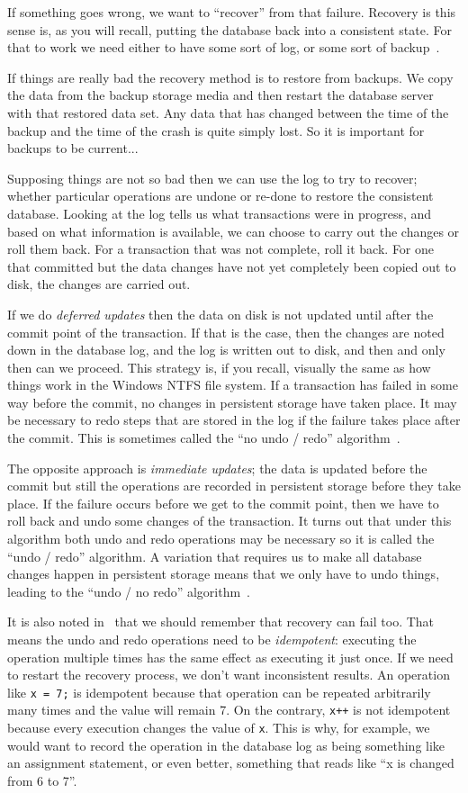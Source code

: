 If something goes wrong, we want to ``recover'' from that failure. Recovery is this sense is, as you will recall, putting the database back into a consistent state. For that to work we need either to have some sort of log, or some sort of backup~\cite{fds}.

If things are really bad the recovery method is to restore from backups. We copy the data from the backup storage media and then restart the database server with that restored data set. Any data that has changed between the time of the backup and the time of the crash is quite simply lost. So it is important for backups to be current...

Supposing things are not so bad then we can use the log to try to recover; whether particular operations are undone or re-done to restore the consistent database. Looking at the log tells us what transactions were in progress, and based on what information is available, we can choose to carry out the changes or roll them back. For a transaction that was not complete, roll it back. For one that committed but the data changes have not yet completely been copied out to disk,  the changes are carried out.

If we do \textit{deferred updates} then the data on disk is not updated until after the commit point of the transaction. If that is the case, then the changes are noted down in the database log, and the log is written out to disk, and then and only then can we proceed. This strategy is, if you recall, visually the same as how things work in the Windows NTFS file system. If a transaction has failed in some way before the commit, no changes in persistent storage have taken place. It may be necessary to redo steps that are stored in the log if the failure takes place after the commit. This is sometimes called the ``no undo / redo'' algorithm~\cite{fds}.

The opposite approach is \textit{immediate updates}; the data is updated before the commit but still the operations are recorded in persistent storage before they take place. If the failure occurs before we get to the commit point, then we have to roll back and undo some changes of the transaction. It turns out that under this algorithm both undo and redo operations may be necessary so it is called the ``undo / redo'' algorithm. A variation that requires us to make all database changes happen in persistent storage means that we only have to undo things, leading to the ``undo / no redo'' algorithm~\cite{fds}.

It is also noted in~\cite{fds} that we should remember that recovery can fail too. That means the undo and redo operations need to be \textit{idempotent}: executing the operation multiple times has the same effect as executing it just once. If we need to restart the recovery process, we don't want inconsistent results. An operation like \texttt{x = 7;} is idempotent because that operation can be repeated arbitrarily many times and the value will remain 7. On the contrary, \texttt{x++} is not idempotent because every execution changes the value of \texttt{x}. This is why, for example, we would want to record the operation in the database log as being something like an assignment statement, or even better, something that reads like ``x is changed from 6 to 7''.

